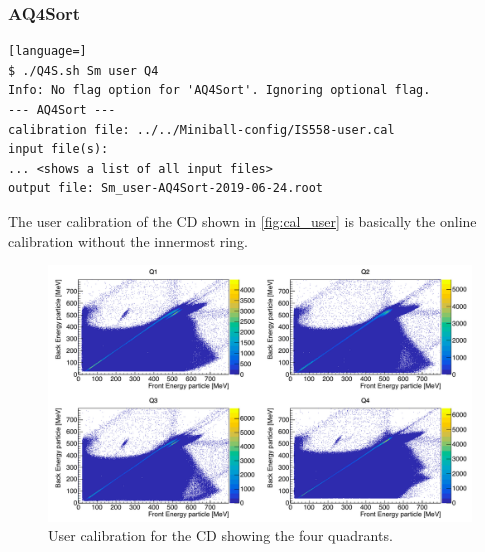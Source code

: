 \documentclass[twoside,english]{uiofysmaster/uiofysmaster}
\begin{document}
\subsubsection*{AQ4Sort}
\begin{lstlisting}[language=]
$ ./Q4S.sh Sm user Q4
Info: No flag option for 'AQ4Sort'. Ignoring optional flag.
--- AQ4Sort ---
calibration file: ../../Miniball-config/IS558-user.cal
input file(s):
... <shows a list of all input files>
output file: Sm_user-AQ4Sort-2019-06-24.root
\end{lstlisting}



The user calibration of the CD shown in \autoref{fig:cal_user} is basically the online calibration without the innermost ring. 

\begin{figure}[ht]
	\centering
	\includegraphics[width=\textwidth]{../Plots/plotting/E_f_b_Q1-4-user.png}
	\caption{User calibration for the CD showing the four quadrants.}
	\label{fig:cal_user}
\end{figure}


%
%
%
\end{document}
